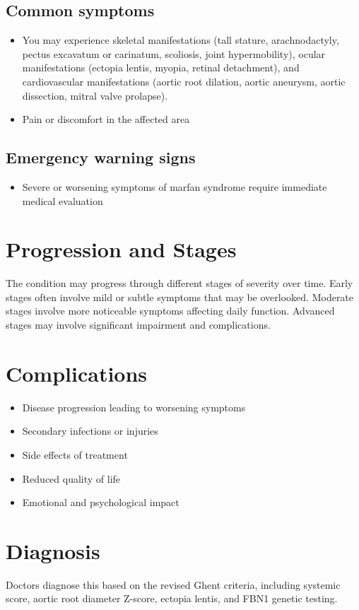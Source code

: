 \subsection{Common symptoms}
\begin{itemize}[noitemsep]
  \item You may experience skeletal manifestations (tall stature, arachnodactyly, pectus excavatum or carinatum, scoliosis, joint hypermobility), ocular manifestations (ectopia lentis, myopia, retinal detachment), and cardiovascular manifestations (aortic root dilation, aortic aneurysm, aortic dissection, mitral valve prolapse).

  \item Pain or discomfort in the affected area
  \end{itemize}

\subsection{Emergency warning signs}
\begin{itemize}[noitemsep]
  \item Severe or worsening symptoms of marfan syndrome require immediate medical evaluation
\end{itemize}
\section{Progression and Stages}
The condition may progress through different stages of severity over time. Early stages often involve mild or subtle symptoms that may be overlooked. Moderate stages involve more noticeable symptoms affecting daily function. Advanced stages may involve significant impairment and complications.
\section{Complications}
\begin{itemize}[noitemsep]
  \item Disease progression leading to worsening symptoms
  \item Secondary infections or injuries
  \item Side effects of treatment
  \item Reduced quality of life
  \item Emotional and psychological impact
\end{itemize}
\section{Diagnosis}
Doctors diagnose this based on the revised Ghent criteria, including systemic score, aortic root diameter Z-score, ectopia lentis, and FBN1 genetic testing.

